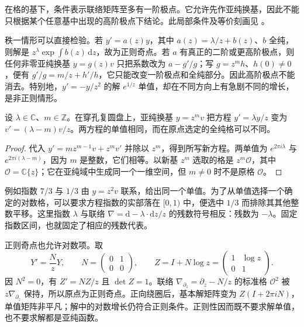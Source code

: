 在格的基下，条件表示联络矩阵至多有一阶极点。它允许先作亚纯换基，因此不能只根据某个任意基中出现的高阶极点下结论。此局部条件及等价刻画见 \cite[Theorem 5.1.4 and Definition 5.1.6, pp. 131--133]{HottaTakeuchiTanisaki2008DModules}。

\ProseParagraphBreak
秩一情形可以直接检验。若 \(y'=a(z)y\)，其中 \(a(z)=\lambda/z+b(z)\)、\(b\) 全纯，则解是 \(z^\lambda\exp\int b(z)\,\mathrm{d}z\)，故为正则奇点。若 \(a\) 有真正的二阶或更高阶极点，则任何非零亚纯换基 \(y=g(z)v\) 只把系数改为 \(a-g'/g\)；写 \(g=z^mh\)、\(h(0)\ne0\)，便有 \(g'/g=m/z+h'/h\)，它只能改变一阶极点和全纯部分。因此高阶极点不能消去。特别地，\(y'=-y/z^2\) 的解 \(e^{1/z}\) 单值，却在不同方向上有急剧不同的增长，是非正则情形。

\begin{proposition}\label{b5:prop:D-integer-exponent-shift}
	设 \(\lambda\in\mathbb C\)、\(m\in\mathbb Z\)。在穿孔复圆盘上，亚纯换基 \(y=z^mv\) 把方程 \(y'=\lambda y/z\) 变为 \(v'=(\lambda-m)v/z\)。两方程的单值相同，而在原点选定的全纯格可以不同。
\end{proposition}
\begin{proof}
	代入 \(y'=mz^{m-1}v+z^mv'\) 并除以 \(z^m\)，得到所写新方程。两单值为 \(e^{2\pi i\lambda}\) 与 \(e^{2\pi i(\lambda-m)}\)，因为 \(m\) 是整数，它们相等。以新基 \(z^m\) 选取的格是 \(z^m\mathcal O\)，其中 \(\mathcal O=\mathbb C\{z\}\)；它在亚纯域中生成同一个一维空间，但 \(m\ne0\) 时不是原格 \(\mathcal O\)。
\end{proof}

例如指数 \(7/3\) 与 \(1/3\) 由 \(y=z^2v\) 联系，给出同一个单值。为了从单值选择一个确定的对数格，可以要求方程指数的实部落在 \([0,1)\) 中，便选中 \(1/3\) 而排除其其他整数平移。这里指数 \(\lambda\) 与联络 \(\nabla=\mathrm{d}-\lambda\cdot\mathrm{d}z/z\) 的残数符号相反：残数为 \(-\lambda\)。固定指数区间，也就固定了相应的残数代表。

\ProseParagraphBreak
正则奇点也允许对数项。取
\[
	Y'=\frac NzY,\qquad
	N=\begin{pmatrix}0&1\\0&0\end{pmatrix},\qquad
	Z=I+N\log z=\begin{pmatrix}1&\log z\\0&1\end{pmatrix}.
\]
因 \(N^2=0\)，有 \(Z'=NZ/z\) 且 \(\det Z=1\)。联络 \(\nabla_{\partial_z}=\partial_z-N/z\) 的标准格 \(\mathcal O^2\) 被 \(z\nabla_{\partial_z}\) 保持，所以原点为正则奇点。正向绕圈后，基本解矩阵变为 \(Z(I+2\pi iN)\)，单值矩阵非平凡；解中的对数增长仍符合正则条件。正则性因而既不要求解单值，也不要求解都是亚纯函数。

